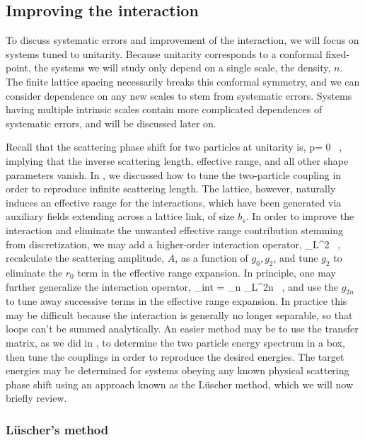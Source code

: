 \subsection{\label{sec:improve}Improving the interaction}
To discuss systematic errors and improvement of the interaction, we will focus on systems tuned to unitarity. Because unitarity corresponds to a conformal fixed-point, the systems we will study only depend on a single scale, the density, $n$. The finite lattice spacing necessarily breaks this conformal symmetry, and we can consider dependence on any new scales to stem from systematic errors. Systems having multiple intrinsic scales contain more complicated dependences of systematic errors, and will be discussed later on. 

Recall that the scattering phase shift for two particles at unitarity is,
\beq
p\cot\delta = 0 \ , 
\eeq
implying that the inverse scattering length, effective range, and all other shape parameters vanish. In , we discussed how to tune the two-particle coupling in order to reproduce infinite scattering length. The lattice, however, naturally induces an effective range for the interactions, which have been generated via auxiliary fields extending across a lattice link, of size $b_s$. In order to improve the interaction and eliminate the unwanted effective range contribution stemming from discretization, we may add a higher-order interaction operator,
\beq
{} \phi \psidag \nabla_L^2 \psi \ ,
\eeq
recalculate the scattering amplitude, $A$, as a function of $g_0, g_2$, and tune $g_2$ to eliminate the $r_0$ term in the effective range expansion. In principle, one may further generalize the interaction operator,
\beq
\calL_{\mbox{\tiny int}} = \sum_n   \phi \psidag \nabla_L^{2n} \psi \ ,
\eeq
and use the $g_{2n}$ to tune away successive terms in the effective range expansion. In practice this may be difficult because the interaction is generally no longer separable, so that loops can't be summed analytically. An easier method may be to use the transfer matrix, as we did in , to determine the two particle energy spectrum in a box, then tune the couplings in order to reproduce the desired energies. The target energies may be determined for systems obeying any known physical scattering phase shift using an approach known as the L\"uscher method, which we will now briefly review.

\subsubsection{\label{sec:Luscher}L\"uscher's method}

